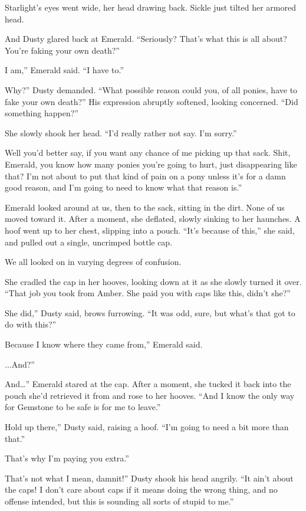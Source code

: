 Starlight’s eyes went wide, her head drawing back. Sickle just tilted her armored head.

And Dusty glared back at Emerald. “Seriously? That’s what this is all about? You’re faking your own death?”

\leavevmode{}I am,” Emerald said. “I have to.”

\leavevmode{}Why?” Dusty demanded. “What possible reason could you, of all ponies, have to fake your own death?” His expression abruptly softened, looking concerned. “Did something happen?”

She slowly shook her head. “I’d really rather not say. I’m sorry.”

\leavevmode{}Well you’d better say, if you want any chance of me picking up that sack. Shit, Emerald, you know how many ponies you’re going to hurt, just disappearing like that? I’m not about to put that kind of pain on a pony unless it’s for a damn good reason, and I’m going to need to know what that reason is.”

Emerald looked around at us, then to the sack, sitting in the dirt. None of us moved toward it. After a moment, she deflated, slowly sinking to her haunches. A hoof went up to her chest, slipping into a pouch. “It’s because of this,” she said, and pulled out a single, uncrimped bottle cap.

We all looked on in varying degrees of confusion.

She cradled the cap in her hooves, looking down at it as she slowly turned it over. “That job you took from Amber. She paid you with caps like this, didn’t she?”

\leavevmode{}She did,” Dusty said, brows furrowing. “It was odd, sure, but what’s that got to do with this?”

\leavevmode{}Because I know where they came from,” Emerald said.

\leavevmode{}...And?”

\leavevmode{}And…” Emerald stared at the cap. After a moment, she tucked it back into the pouch she’d retrieved it from and rose to her hooves. “And I know the only way for Gemstone to be safe is for me to leave.”

\leavevmode{}Hold up there,” Dusty said, raising a hoof. “I’m going to need a bit more than that.”

\leavevmode{}That’s why I’m paying you extra.”

\leavevmode{}That’s not what I mean, damnit!” Dusty shook his head angrily. “It ain’t about the caps! I don’t care about caps if it means doing the wrong thing, and no offense intended, but this is sounding all sorts of stupid to me.”

